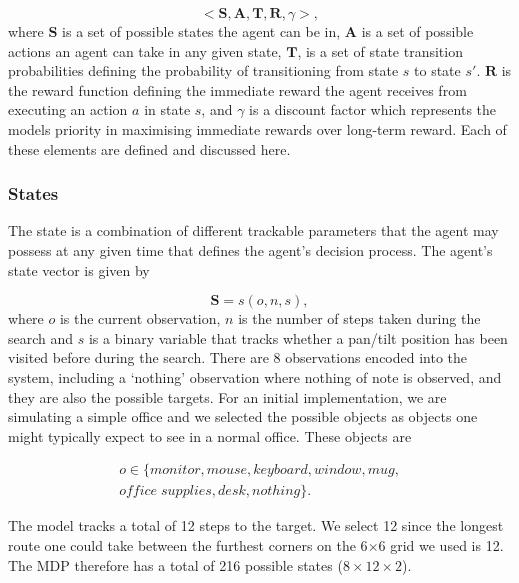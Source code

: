\documentclass[a4paper, twoside]{article}
\begin{document}
\begin{equation}
  <\mathbf{S}, \mathbf{A}, \mathbf{T}, \mathbf{R}, \gamma>, 
\end{equation}
where $\mathbf{S}$ is a set of possible states the agent can be in, $\mathbf{A}$ is a set of possible actions an agent can take in any given state, $\mathbf{T}$, is a set of state transition probabilities defining the probability of transitioning from state $s$ to state $s'$. $\mathbf{R}$ is the reward function defining the immediate reward the agent receives from executing an action $a$ in state $s$, and $\gamma$ is a discount factor which represents the models priority in maximising immediate rewards over long-term reward. Each of these elements are defined and discussed here.

\subsubsection{States}\label{sec:states}

\noindent The state is a combination of different trackable parameters that the agent may possess at any given time that defines the agent's decision process. The agent's state vector is given by 

\begin{equation}
  \mathbf{S} = s(o, n, s), 
\end{equation}
where $o$ is the current observation, $n$ is the number of steps taken during the search and $s$ is a binary variable that tracks whether a pan/tilt position has been visited before during the search. There are 8 observations encoded into the system, including a `nothing' observation where nothing of note is observed, and they are also the possible targets. For an initial implementation, we are simulating a simple office and we selected the possible objects as objects one might typically expect to see in a normal office. These objects are

\begin{equation}
  \begin{aligned}
    o\in \{monitor, mouse, keyboard, window, mug,\\ office\;supplies, desk, nothing\}.
  \end{aligned}
\end{equation}

The model tracks a total of 12 steps to the target. We select 12 since the longest route one could take between the furthest corners on the 6$\times$6 grid we used is 12. The MDP therefore has a total of 216 possible states ($8\times12\times2$).
\end{document}
